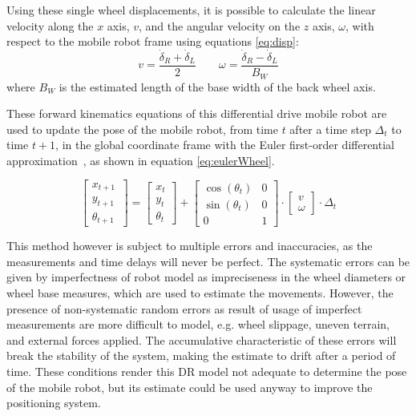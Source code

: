Using these single wheel displacements, it is possible to calculate the linear velocity along the $x$ axis, $v$, and the angular velocity on the $z$ axis, $\omega$, with respect to the mobile robot frame using equations \ref{eq:disp}:
\begin{equation}
    v =\frac{\dot \delta_{R} + \dot \delta_{L} }{2} \qquad \omega = \frac{\dot \delta _{R} - \dot \delta_{L}}{B_W}
\label{eq:disp}
\end{equation} where $B_W$ is the estimated length of the base width of the back wheel axis.


These forward kinematics equations of this differential drive mobile robot are used to update the pose of the mobile robot, from time $t$ after a time step $\Delta_t$ to time $t+1$, in the global coordinate frame with the Euler first-order differential approximation~\cite{braun_first-order_1993}, as shown in equation \ref{eq:eulerWheel}.

\begin{equation}
\begin{bmatrix} x_{t + 1} \\ y_{t + 1} \\ \theta _{t + 1} ~ \end{bmatrix}
=
\begin{bmatrix} {x_t} \\ {y_t} \\ {\theta _t}  \end{bmatrix}
+
\begin{bmatrix}  \cos (\theta _t ) & 0\\  \sin (\theta _t ) & 0 \\ 0 & 1 \end{bmatrix}
\cdot
\begin{bmatrix} v \\ \omega \end{bmatrix} \cdot
\Delta_t
\label{eq:eulerWheel}
\end{equation}


This method however is subject to multiple errors and inaccuracies, as the measurements and time delays will never be perfect.
The systematic errors can be given by imperfectness of robot model as impreciseness in the wheel diameters or wheel base measures, which are used to estimate the movements.
However, the presence of non-systematic random errors as result of usage of imperfect measurements are more difficult to model, e.g. wheel slippage, uneven terrain, and external forces applied.
The accumulative characteristic of these errors will break the stability of the system, making the estimate to drift after a period of time.
These conditions render this \gls{DR} model not adequate to determine the pose of the mobile robot, but its estimate could be used anyway to improve the positioning system.




